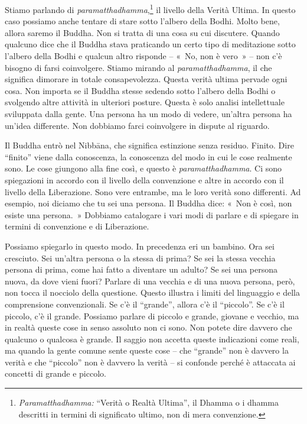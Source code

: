 Stiamo parlando di \emph{paramatthadhamma},\footnote{\emph{Paramatthadhamma:}
  ``Verità o Realtà Ultima'', il Dhamma o i dhamma descritti in
  termini di significato ultimo, non di mera convenzione.} il livello
della Verità Ultima. In questo caso possiamo anche tentare di stare
sotto l'albero della Bodhi. Molto bene, allora saremo il Buddha. Non si
tratta di una cosa su cui discutere. Quando qualcuno dice che il Buddha
stava praticando un certo tipo di meditazione sotto l'albero della Bodhi
e qualcun altro risponde -- «~No, non è vero~» -- non c'è bisogno di
farsi coinvolgere. Stiamo mirando al \emph{paramatthadhamma}, il che
significa dimorare in totale consapevolezza. Questa verità ultima
pervade ogni cosa. Non importa se il Buddha stesse sedendo sotto
l'albero della Bodhi o svolgendo altre attività in ulteriori posture.
Questa è solo analisi intellettuale sviluppata dalla gente. Una persona
ha un modo di vedere, un'altra persona ha un'idea differente. Non
dobbiamo farci coinvolgere in dispute al riguardo.

Il Buddha entrò nel Nibbāna, che significa estinzione senza
residuo. Finito. Dire ``finito'' viene dalla conoscenza, la conoscenza
del modo in cui le cose realmente sono. Le cose giungono alla fine così,
e questo è \emph{paramatthadhamma}. Ci sono spiegazioni in accordo con
il livello della convenzione e altre in accordo con il livello della
Liberazione. Sono vere entrambe, ma le loro verità sono differenti. Ad
esempio, noi diciamo che tu sei una persona. Il Buddha dice: «~Non è
così, non esiste una persona.~» Dobbiamo catalogare i vari modi di
parlare e di spiegare in termini di convenzione e di Liberazione.

Possiamo spiegarlo in questo modo. In precedenza eri un bambino. Ora sei
cresciuto. Sei un'altra persona o la stessa di prima? Se sei la stessa
vecchia persona di prima, come hai fatto a diventare un adulto? Se sei
una persona nuova, da dove vieni fuori? Parlare di una vecchia e di una
nuova persona, però, non tocca il nocciolo della questione. Questo
illustra i limiti del linguaggio e della comprensione convenzionali. Se
c'è il ``grande'', allora c'è il ``piccolo''. Se c'è il piccolo, c'è il
grande. Possiamo parlare di piccolo e grande, giovane e vecchio, ma in
realtà queste cose in senso assoluto non ci sono. Non potete dire
davvero che qualcuno o qualcosa è grande. Il saggio non accetta queste
indicazioni come reali, ma quando la gente comune sente queste cose --
che ``grande'' non è davvero la verità e che ``piccolo'' non è davvero
la verità -- si confonde perché è attaccata ai concetti di grande e
piccolo.

